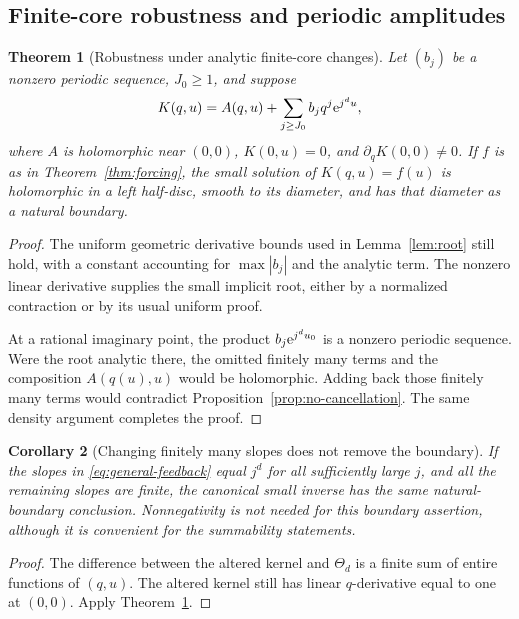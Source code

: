 \documentclass[11pt,a4paper]{article}
\numberwithin{equation}{section}
\newtheorem{theorem}{Theorem}[section]
\newtheorem{corollary}[theorem]{Corollary}
\theoremstyle{definition}\newtheorem{definition}[theorem]{Definition}
\theoremstyle{remark}\newtheorem{remark}[theorem]{Remark}
\theoremstyle{definition}
\begin{document}
\subsection{Finite-core robustness and periodic amplitudes}
\begin{theorem}[Robustness under analytic finite-core changes]
\label{thm:robust}
Let $(b_j)$ be a nonzero periodic sequence, $J_0\ge1$, and suppose
\begin{equation}
 K(q,u)=A(q,u)+\sum_{j\ge J_0}b_jq^j\mathrm e^{j^d u},
 \label{eq:robust-kernel}
\end{equation}
where $A$ is holomorphic near $(0,0)$, $K(0,u)=0$, and
$\partial_qK(0,0)\ne0$. If $f$ is as in Theorem~\ref{thm:forcing}, the small
solution of $K(q,u)=f(u)$ is holomorphic in a left half-disc, smooth to its
diameter, and has that diameter as a natural boundary.
\end{theorem}
\begin{proof}
The uniform geometric derivative bounds used in Lemma~\ref{lem:root} still
hold, with a constant accounting for $\max|b_j|$ and the analytic term. The
nonzero linear derivative supplies the small implicit root, either by a
normalized contraction or by its usual uniform proof.

At a rational imaginary point, the product
$b_j\mathrm e^{j^d u_0}$ is a nonzero periodic sequence. Were the root analytic
there, the omitted finitely many terms and the composition $A(q(u),u)$ would
be holomorphic. Adding back those finitely many terms would contradict
Proposition~\ref{prop:no-cancellation}. The same density argument completes
the proof.
\end{proof}

\begin{corollary}[Changing finitely many slopes does not remove the boundary]
\label{cor:finite-slopes}
If the slopes in \eqref{eq:general-feedback} equal $j^d$ for all sufficiently
large $j$, and all the remaining slopes are finite, the canonical small inverse
has the same natural-boundary conclusion. Nonnegativity is not needed for this
boundary assertion, although it is convenient for the summability statements.
\end{corollary}
\begin{proof}
The difference between the altered kernel and $\Theta_d$ is a finite sum of
entire functions of $(q,u)$. The altered kernel still has linear
$q$-derivative equal to one at $(0,0)$.
Apply Theorem~\ref{thm:robust}.
\end{proof}
\end{document}
